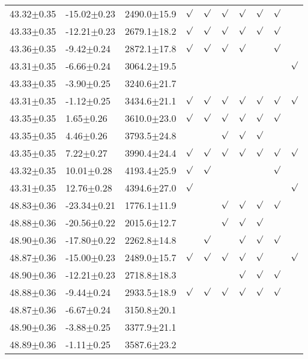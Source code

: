 \begin{table}[h]
\begin{center}
\begin{tabular}{llllllllll}
43.32$\pm$0.35 & -15.02$\pm$0.23 & 2490.0$\pm$15.9& $\surd$ & $\surd$ & $\surd$ & $\surd$ & $\surd$ & $\surd$ & \\
43.33$\pm$0.35 & -12.21$\pm$0.23 & 2679.1$\pm$18.2& $\surd$ & $\surd$ & $\surd$ & $\surd$ & $\surd$ & $\surd$ & \\
43.36$\pm$0.35 & -9.42$\pm$0.24 & 2872.1$\pm$17.8& $\surd$ & $\surd$ & $\surd$ & $\surd$ & & $\surd$ & \\
43.31$\pm$0.35 & -6.66$\pm$0.24 & 3064.2$\pm$19.5& & & & & & & $\surd$ \\
43.33$\pm$0.35 & -3.90$\pm$0.25 & 3240.6$\pm$21.7& & & & & & & \\
43.31$\pm$0.35 & -1.12$\pm$0.25 & 3434.6$\pm$21.1& $\surd$ & $\surd$ & $\surd$ & $\surd$ & $\surd$ & $\surd$ & $\surd$ \\
43.35$\pm$0.35 & 1.65$\pm$0.26 & 3610.0$\pm$23.0& $\surd$ & $\surd$ & $\surd$ & $\surd$ & $\surd$ & $\surd$ & \\
43.35$\pm$0.35 & 4.46$\pm$0.26 & 3793.5$\pm$24.8& & & $\surd$ & $\surd$ & $\surd$ & & \\
43.35$\pm$0.35 & 7.22$\pm$0.27 & 3990.4$\pm$24.4& $\surd$ & $\surd$ & $\surd$ & $\surd$ & $\surd$ & $\surd$ & $\surd$ \\
43.32$\pm$0.35 & 10.01$\pm$0.28 & 4193.4$\pm$25.9& $\surd$ & $\surd$ & & & & $\surd$ & \\
43.31$\pm$0.35 & 12.76$\pm$0.28 & 4394.6$\pm$27.0& $\surd$ & & & & & & $\surd$ \\
48.83$\pm$0.36 & -23.34$\pm$0.21 & 1776.1$\pm$11.9& & & $\surd$ & $\surd$ & $\surd$ & $\surd$ & \\
48.88$\pm$0.36 & -20.56$\pm$0.22 & 2015.6$\pm$12.7& & & $\surd$ & $\surd$ & $\surd$ & & \\
48.90$\pm$0.36 & -17.80$\pm$0.22 & 2262.8$\pm$14.8& & $\surd$ & & $\surd$ & $\surd$ & $\surd$ & \\
48.87$\pm$0.36 & -15.00$\pm$0.23 & 2489.0$\pm$15.7& $\surd$ & $\surd$ & $\surd$ & $\surd$ & $\surd$ & & $\surd$ \\
48.90$\pm$0.36 & -12.21$\pm$0.23 & 2718.8$\pm$18.3& & & & $\surd$ & $\surd$ & $\surd$ & \\
48.88$\pm$0.36 & -9.44$\pm$0.24 & 2933.5$\pm$18.9& $\surd$ & $\surd$ & $\surd$ & $\surd$ & $\surd$ & $\surd$ & \\
48.87$\pm$0.36 & -6.67$\pm$0.24 & 3150.8$\pm$20.1& & & & & & & \\
48.90$\pm$0.36 & -3.88$\pm$0.25 & 3377.9$\pm$21.1& & & & & & & \\
48.89$\pm$0.36 & -1.11$\pm$0.25 & 3587.6$\pm$23.2& & & & & & & \\

\end{tabular}
\end{center}
\end{table}
